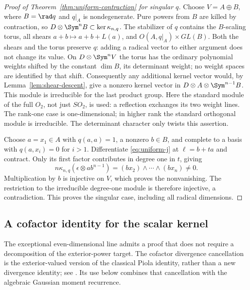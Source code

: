 \begin{proof}[Proof of Theorem~\ref{thm:uniform-contraction} for singular \(q\)]
Choose \(V=A\oplus B\), where \(B=\rad q\) and \(q|_A\)
is nondegenerate.  Pure powers from \(B\) are killed by contraction,
so \(D\otimes\Sym^nB\subset\ker\kappa_{n,q}\).
The stabilizer of \(q\) contains the \(B\)-scaling torus, all
shears \(a+b\mapsto a+b+L(a)\), and \(O(A,q|_A)\times GL(B)\).
Both the shears and the torus preserve \(q\): adding a radical
vector to either argument does not change its value.  On
\(D\otimes\Sym^nV\) the torus has the ordinary polynomial
weights shifted by the constant \(\dim B\), its determinant
weight; no weight spaces are identified by that shift.
Consequently any additional kernel vector would, by
Lemma~\ref{lem:shear-descent}, give a nonzero kernel vector in
\(D\otimes A\otimes\Sym^{n-1}B\).
This module is irreducible for the last product group.  Here the
standard module of the full \(O_2\), not just \(SO_2\), is used:
a reflection exchanges its two weight lines.  The rank-one case is
one-dimensional; in higher rank the standard orthogonal module is
irreducible.  The determinant character only twists this assertion.

Choose \(a=x_1\in A\) with \(q(a,a)=1\), a nonzero \(b\in B\),
and complete to a basis with \(q(a,x_i)=0\) for \(i>1\).
Differentiate \eqref{eq:uniform-j} at \(\ell=b+ta\) and contract.
Only its first factor contributes in degree one in \(t\), giving
\begin{equation}\label{eq:uniform-singular-nonzero}
 n\kappa_{n,q}(\epsilon\otimes ab^{n-1})
       =(bx_2)\wedge\cdots\wedge(bx_n)\ne0.
\end{equation}
Multiplication by \(b\) is injective on \(V\), which proves the
nonvanishing.  The restriction to the irreducible degree-one module
is therefore injective, a contradiction.  This proves the singular
case, including all radical dimensions.
\end{proof}

\subsection{A cofactor identity for the scalar kernel}

The exceptional even-dimensional line admits a proof that does not
require a decomposition of the exterior-power target.  The cofactor
divergence cancellation is the exterior-valued version of the classical
Piola identity, rather than a new divergence identity; see
\cite[equation (1.1), \S3.1]{KupfermanShachar}.  Its use below combines
that cancellation with the algebraic Gaussian moment recurrence.

